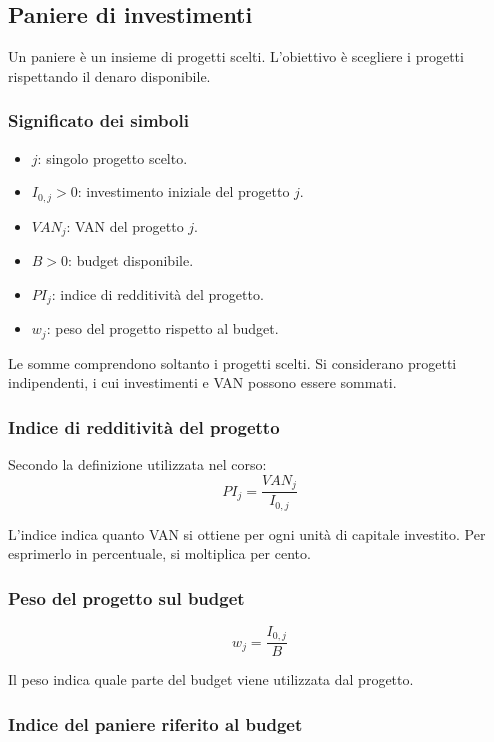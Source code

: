 \subsection{Paniere di investimenti}

\noindent
Un paniere è un insieme di progetti scelti.
L'obiettivo è scegliere i progetti rispettando
il denaro disponibile.

\subsubsection*{Significato dei simboli}

\begin{itemize}
    \item $j$: singolo progetto scelto.
    \item $I_{0,j}>0$: investimento iniziale del progetto $j$.
    \item $VAN_j$: VAN del progetto $j$.
    \item $B>0$: budget disponibile.
    \item $PI_j$: indice di redditività del progetto.
    \item $w_j$: peso del progetto rispetto al budget.
\end{itemize}

\noindent
Le somme comprendono soltanto i progetti scelti.
Si considerano progetti indipendenti, i cui investimenti
e VAN possono essere sommati.

\subsubsection*{Indice di redditività del progetto}

\noindent
Secondo la definizione utilizzata nel corso:
\[
    PI_j=\frac{VAN_j}{I_{0,j}}
\]

\noindent
L'indice indica quanto VAN si ottiene per ogni unità
di capitale investito.
Per esprimerlo in percentuale, si moltiplica per cento.

\subsubsection*{Peso del progetto sul budget}

\[
    w_j=\frac{I_{0,j}}{B}
\]

\noindent
Il peso indica quale parte del budget viene utilizzata
dal progetto.

\subsubsection*{Indice del paniere riferito al budget}


